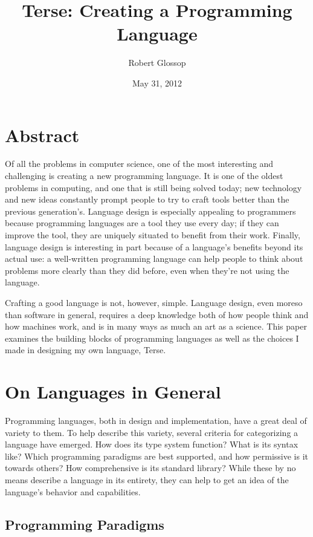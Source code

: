 \documentclass[12pt]{report}
\title{Terse: Creating a Programming Language}
\date{May 31, 2012}
\author{Robert Glossop}
\begin{document}
\maketitle
\clearpage

\section*{Abstract}

Of all the problems in computer science, one of the most interesting
and challenging is creating a new programming language. It is one of
the oldest problems in computing, and one that is still being solved
today; new technology and new ideas constantly prompt people to try to
craft tools better than the previous generation's. Language design is
especially appealing to programmers because programming languages are
a tool they use every day; if they can improve the tool, they are
uniquely situated to benefit from their work. Finally, language design
is interesting in part because of a language's benefits beyond its
actual use: a well-written programming language can help people to
think about problems more clearly than they did before, even when
they're not using the language. 

Crafting a good language is not, however, simple. Language design,
even moreso than software in general, requires a deep knowledge both
of how people think and how machines work, and is in many ways as much
an art as a science. This paper examines the building blocks of
programming languages as well as the choices I made in designing my
own language, Terse.

\clearpage

\section*{On Languages in General}

Programming languages, both in design and implementation, have a great
deal of variety to them. To help describe this variety, several
criteria for categorizing a language have emerged.  How does its type
system function? What is its syntax like? Which programming paradigms
are best supported, and how permissive is it towards others? How
comprehensive is its standard library? While these by no means
describe a language in its entirety, they can help to get an idea of
the language's behavior and capabilities.

\subsection*{Programming Paradigms}
\end{document}
